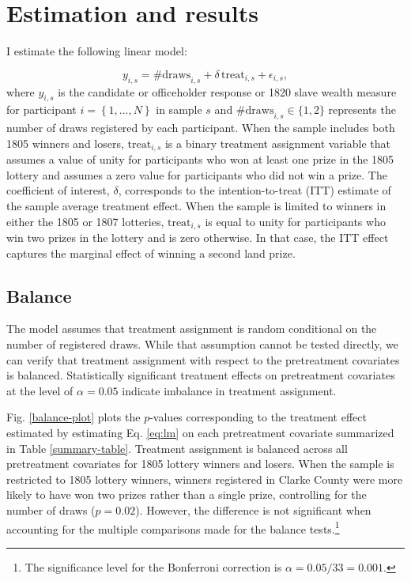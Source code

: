 \section{Estimation and results} \label{results} 

I estimate the following linear model:

\begin{equation} 
y_{i,s} =  \text{\# draws}_{i,s} + \delta \, \text{treat}_{i,s} + \epsilon_{i,s}, \label{eq:lm} 
\end{equation} 
\noindent
where $y_{i,s}$ is the candidate or officeholder response or 1820 slave wealth measure for participant $i = \left\{1, ..., N \right\}$ in sample $s$ and $\text{\# draws}_{i,s} \in \{1,2\}$ represents the number of draws registered by each participant. When the sample includes both 1805 winners and losers, $\text{treat}_{i,s}$ is a binary treatment assignment variable that assumes a value of unity for participants who won at least one prize in the 1805 lottery and assumes a zero value for participants who did not win a prize. The coefficient of interest, $\delta$, corresponds to the intention-to-treat (ITT) estimate of the sample average treatment effect. When the sample is limited to winners in either the 1805 or 1807 lotteries, $\text{treat}_{i,s}$ is equal to unity for participants who win two prizes in the lottery and is zero otherwise. In that case, the ITT effect captures the marginal effect of winning a second land prize. 

\subsection{Balance}

The model assumes that treatment assignment is random conditional on the number of registered draws. While that assumption cannot be tested directly, we can verify that treatment assignment with respect to the pretreatment covariates is balanced. Statistically significant treatment effects on pretreatment covariates at the level of $\alpha= 0.05$ indicate imbalance in treatment assignment. 

Fig. \ref{balance-plot} plots the $p$-values corresponding to the treatment effect estimated by estimating Eq. \ref{eq:lm} on each pretreatment covariate summarized in Table \ref{summary-table}. Treatment assignment is balanced across all pretreatment covariates for 1805 lottery winners and losers. When the sample is restricted to 1805 lottery winners, winners registered in Clarke County were more likely to have won two prizes rather than a single prize, controlling for the number of draws ($p=0.02$). However, the difference is not significant when accounting for the multiple comparisons made for the balance tests.\footnote{The significance level for the Bonferroni correction is $\alpha= 0.05/33 = 0.001$.}

